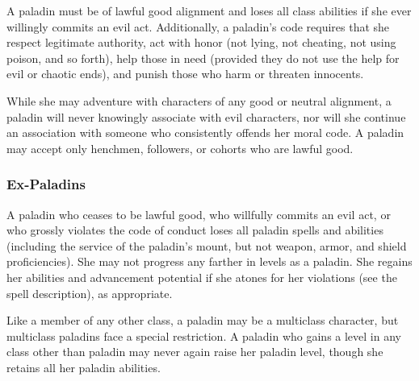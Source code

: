  A paladin must be of lawful good alignment
and loses all class abilities if she ever willingly commits an evil act.
Additionally, a paladin's code requires that she respect legitimate
authority, act with honor (not lying, not cheating, not using poison,
and so forth), help those in need (provided they do not use the help
for evil or chaotic ends), and punish those who harm or threaten
innocents.

 While she may adventure with characters of any good or neutral alignment, a paladin will never knowingly associate with evil characters, nor will she continue an association with someone who consistently offends her moral code. A paladin may accept only henchmen, followers, or cohorts who are lawful good.

\subsubsection{Ex-Paladins}
A paladin who ceases to be lawful good, who willfully commits an evil act, or who grossly violates the code of conduct loses all paladin spells and abilities (including the service of the paladin's mount, but not weapon, armor, and shield proficiencies). She may not progress any farther in levels as a paladin. She regains her abilities and advancement potential if she atones for her violations (see the  spell description), as appropriate.

Like a member of any other class, a paladin may be a multiclass character, but multiclass paladins face a special restriction. A paladin who gains a level in any class other than paladin may never again raise her paladin level, though she retains all her paladin abilities.

